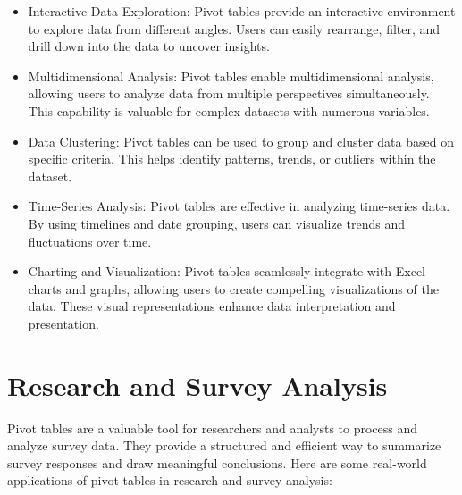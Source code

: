 \documentclass[
]{book}
\begin{document}
\begin{itemize}
\item
  Interactive Data Exploration: Pivot tables provide an interactive environment to explore data from different angles. Users can easily rearrange, filter, and drill down into the data to uncover insights.
\item
  Multidimensional Analysis: Pivot tables enable multidimensional analysis, allowing users to analyze data from multiple perspectives simultaneously. This capability is valuable for complex datasets with numerous variables.
\item
  Data Clustering: Pivot tables can be used to group and cluster data based on specific criteria. This helps identify patterns, trends, or outliers within the dataset.
\item
  Time-Series Analysis: Pivot tables are effective in analyzing time-series data. By using timelines and date grouping, users can visualize trends and fluctuations over time.
\item
  Charting and Visualization: Pivot tables seamlessly integrate with Excel charts and graphs, allowing users to create compelling visualizations of the data. These visual representations enhance data interpretation and presentation.
\end{itemize}

\hypertarget{research-and-survey-analysis}{%
\section{Research and Survey Analysis}\label{research-and-survey-analysis}}

Pivot tables are a valuable tool for researchers and analysts to process and analyze survey data. They provide a structured and efficient way to summarize survey responses and draw meaningful conclusions. Here are some real-world applications of pivot tables in research and survey analysis:
\end{document}

